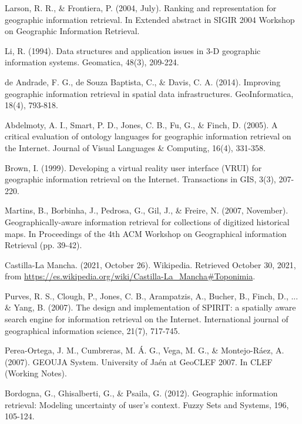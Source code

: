 \documentclass{irsarticle}
\begin{document}
\begin{thebibliography}{}
Larson, R. R., \& Frontiera, P. (2004, July). Ranking and representation for
geographic information retrieval. In Extended abstract in SIGIR 2004 Workshop
on Geographic Information Retrieval.

Li, R. (1994). Data structures and application issues in 3-D geographic
information systems. Geomatica, 48(3), 209-224.

de Andrade, F. G., de Souza Baptista, C., \& Davis, C. A. (2014). Improving
geographic information retrieval in spatial data infrastructures.
GeoInformatica, 18(4), 793-818.

Abdelmoty, A. I., Smart, P. D., Jones, C. B., Fu, G., \& Finch, D. (2005). A
critical evaluation of ontology languages for geographic information retrieval
on the Internet. Journal of Visual Languages \& Computing, 16(4), 331-358.

Brown, I. (1999). Developing a virtual reality user interface (VRUI) for
geographic information retrieval on the Internet. Transactions in GIS, 3(3),
207-220.

Martins, B., Borbinha, J., Pedrosa, G., Gil, J., \& Freire, N. (2007, November).
Geographically-aware information retrieval for collections of digitized
historical maps. In Proceedings of the 4th ACM Workshop on Geographical
information Retrieval (pp. 39-42).

Castilla-La Mancha. (2021, October 26). Wikipedia. Retrieved October 30, 2021,
from \url{https://es.wikipedia.org/wiki/Castilla-La_Mancha#Toponimia}.

 Purves, R. S., Clough, P., Jones, C. B., Arampatzis, A., Bucher, B.,
Finch, D., ... \& Yang, B. (2007). The design and implementation of SPIRIT: a
spatially aware search engine for information retrieval on the Internet.
International journal of geographical information science, 21(7), 717-745.

 Perea-Ortega, J. M., Cumbreras, M. Á. G., Vega, M. G., \&
Montejo-Ráez, A. (2007). GEOUJA System. University of Jaén at GeoCLEF 2007. In
CLEF (Working Notes).

 Bordogna, G., Ghisalberti, G., \& Psaila, G. (2012). Geographic
information retrieval: Modeling uncertainty of user's context. Fuzzy Sets and
Systems, 196, 105-124.

\end{thebibliography}
\end{document}
